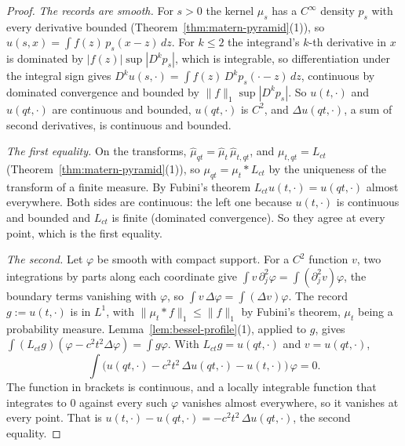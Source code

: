 \begin{proof}
\leanok
{}
\emph{The records are smooth.} For $s > 0$ the kernel $\mu_s$ has a $C^\infty$ density $p_s$ with
every derivative bounded (Theorem~\ref{thm:matern-pyramid}(1)), so
$u(s, x) = \int f(z)\,p_s(x - z)\,dz$. For $k \le 2$ the integrand's $k$-th derivative in $x$ is
dominated by $|f(z)|\sup|D^kp_s|$, which is integrable, so differentiation under the integral sign
gives $D^ku(s, \cdot) = \int f(z)\,D^kp_s(\cdot - z)\,dz$, continuous by dominated convergence and
bounded by $\|f\|_1\sup|D^kp_s|$. So $u(t, \cdot)$ and $u(qt, \cdot)$ are continuous and bounded,
$u(qt, \cdot)$ is $C^2$, and $\Delta u(qt, \cdot)$, a sum of second derivatives, is continuous and
bounded.

\emph{The first equality.} On the transforms, $\widehat\mu_{qt} = \widehat\mu_t\,\widehat\mu_{t,qt}$, and
$\mu_{t,qt} = L_{ct}$ (Theorem~\ref{thm:matern-pyramid}(1)), so $\mu_{qt} = \mu_t * L_{ct}$ by the
uniqueness of the transform of a finite measure. By Fubini's theorem
$L_{ct}u(t, \cdot) = u(qt, \cdot)$ almost everywhere. Both sides are continuous: the left one
because $u(t, \cdot)$ is continuous and bounded and $L_{ct}$ is finite (dominated convergence). So
they agree at every point, which is the first equality.

\emph{The second.} Let $\varphi$ be smooth with compact support. For a $C^2$ function $v$, two
integrations by parts along each coordinate give $\int v\,\partial_j^2\varphi = \int
(\partial_j^2 v)\varphi$, the boundary terms vanishing with $\varphi$, so
$\int v\,\Delta\varphi = \int (\Delta v)\varphi$. The record $g := u(t, \cdot)$ is in $L^1$, with
$\|\mu_t * f\|_1 \le \|f\|_1$ by Fubini's theorem, $\mu_t$ being a probability measure.
Lemma~\ref{lem:bessel-profile}(1), applied to $g$, gives $\int (L_{ct}g)(\varphi - c^2t^2\Delta\varphi) = \int g\varphi$.
With $L_{ct}g = u(qt, \cdot)$ and $v = u(qt, \cdot)$,
\[
  \int \bigl(u(qt, \cdot) - c^2t^2\,\Delta u(qt, \cdot) - u(t, \cdot)\bigr)\,\varphi = 0 .
\]
The function in brackets is continuous, and a locally integrable function that integrates to $0$
against every such $\varphi$ vanishes almost everywhere, so it vanishes at every point. That is
$u(t, \cdot) - u(qt, \cdot) = -c^2t^2\,\Delta u(qt, \cdot)$, the second equality.
\end{proof}

